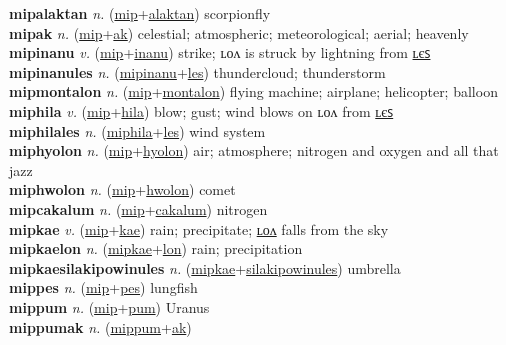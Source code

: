 \textbf{mipalaktan} \textit{n.} (\hyperref[mip]{mip}+\hyperref[alaktan]{alaktan})
scorpionfly \label{mipalaktan} \\
\textbf{mipak} \textit{n.} (\hyperref[mip]{mip}+\hyperref[ak]{ak})
celestial; atmospheric; meteorological; aerial; heavenly \label{mipak} \\
\textbf{mipinanu} \textit{v.} (\hyperref[mip]{mip}+\hyperref[inanu]{inanu})
strike; ʟᴏᴧ is struck by lightning from \hyperref[mipinanules]{ʟєꜱ} \label{mipinanu} \\
\textbf{mipinanules} \textit{n.} (\hyperref[mipinanu]{mipinanu}+\hyperref[les]{les})
thundercloud; thunderstorm \label{mipinanules} \\
\textbf{mipmontalon} \textit{n.} (\hyperref[mip]{mip}+\hyperref[montalon]{montalon})
flying machine; airplane; helicopter; balloon \label{mipmontalon} \\
\textbf{miphila} \textit{v.} (\hyperref[mip]{mip}+\hyperref[hila]{hila})
blow; gust; wind blows on ʟᴏᴧ from \hyperref[miphilales]{ʟєꜱ} \label{miphila} \\
\textbf{miphilales} \textit{n.} (\hyperref[miphila]{miphila}+\hyperref[les]{les})
wind system \label{miphilales} \\
\textbf{miphyolon} \textit{n.} (\hyperref[mip]{mip}+\hyperref[hyolon]{hyolon})
air; atmosphere; nitrogen and oxygen and all that jazz \label{miphyolon} \\
\textbf{miphwolon} \textit{n.} (\hyperref[mip]{mip}+\hyperref[hwolon]{hwolon})
comet \label{miphwolon} \\
\textbf{mipcakalum} \textit{n.} (\hyperref[mip]{mip}+\hyperref[cakalum]{cakalum})
nitrogen \label{mipcakalum} \\
\textbf{mipkae} \textit{v.} (\hyperref[mip]{mip}+\hyperref[kae]{kae})
rain; precipitate; \hyperref[mipkaelon]{ʟᴏᴧ} falls from the sky \label{mipkae} \\
\textbf{mipkaelon} \textit{n.} (\hyperref[mipkae]{mipkae}+\hyperref[lon]{lon})
rain; precipitation \label{mipkaelon} \\
\textbf{mipkaesilakipowinules} \textit{n.} (\hyperref[mipkae]{mipkae}+\hyperref[silakipowinules]{silakipowinules})
umbrella \label{mipkaesilakipowinules} \\
\textbf{mippes} \textit{n.} (\hyperref[mip]{mip}+\hyperref[pes]{pes})
lungfish \label{mippes} \\
\textbf{mippum} \textit{n.} (\hyperref[mip]{mip}+\hyperref[pum]{pum})
Uranus \label{mippum} \\
\textbf{mippumak} \textit{n.} (\hyperref[mippum]{mippum}+\hyperref[ak]{ak})
